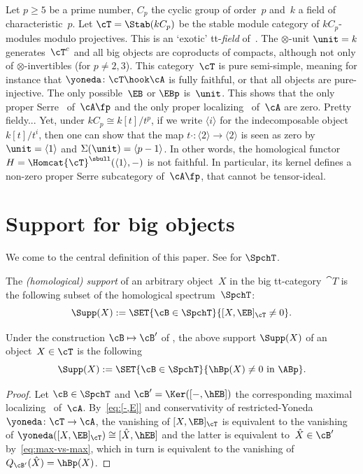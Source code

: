 \begin{Exa}
Let $p\ge 5$ be a prime number, $C_p$ the cyclic group of order~$p$ and~$k$ a field of characteristic~$p$. Let $\cT=\Stab(kC_p)$ be the stable module category of $kC_p$-modules modulo projectives. This is an `exotic' tt-\emph{field} of~\cite{BalmerKrauseStevenson19}. The $\otimes$-unit $\unit=k$ generates~$\cT^c$ and all big objects are coproducts of compacts, although not only of $\otimes$-invertibles (for $p\neq 2,3$). This category~$\cT$ is pure semi-simple, meaning for instance that $\yoneda\colon \cT\hook\cA$ is fully faithful, or that all objects are pure-injective. The only possible~$\EB$ or $\EBp$ is~$\unit$. This shows that the only proper Serre \tensid\ of~$\cA\fp$ and the only proper localizing \tensid\ of~$\cA$ are zero. Pretty fieldy... Yet, under $kC_p\cong k[t]/t^p$, if we write $\langle i\rangle$ for the indecomposable object $k[t]/t^i$, then one can show that the map $t\cdot\colon\langle2\rangle\to \langle2\rangle$ is seen as zero by $\unit=\langle1\rangle$ and $\Sigma(\unit)=\langle p-1\rangle$. In other words, the homological functor $H=\Homcat{\cT}^\sbull(\langle1\rangle,-)$ is not faithful. In particular, its kernel defines a non-zero proper Serre subcategory of~$\cA\fp$, that cannot be tensor-ideal.
\end{Exa}

\section{Support for big objects}
\label{sec:support}

We come to the central definition of this paper. See  for $\SpchT$.

\begin{Def}
\label{Def:Supp}
The \emph{(homological) support} of an arbitrary object~$X$ in the big tt-category~$\cat{T}$ is the following subset of the homological spectrum~$\SpchT$:
\[
\Supp(X):=\SET{\cB\in\SpchT}{[X,\EB]_{\cT}\neq 0}.
\]
\end{Def}

\begin{Prop}
\label{Prop:Supp}
Under the construction $\cB\mapsto \cB'$ of , the above support $\Supp(X)$ of an object~$X\in\cT$ is the following
\[
\Supp(X):=\SET{\cB\in\SpchT}{\hBp(X)\neq 0\text{ in }\ABp}.
\]
\end{Prop}

\begin{proof}
Let $\cB\in\SpchT$ and $\cB'=\Ker([-,\hEB])$ the corresponding maximal localizing \tensid\ of~$\cA$. By~\eqref{eq:[-,E]} and conservativity of restricted-Yoneda $\yoneda\colon \cT\to \cA$, the vanishing of $[X,\EB]_\cT$ is equivalent to the vanishing of $\yoneda([X,\EB]_\cT)\cong [\hat X,\hEB]$ and the latter is equivalent to~$\hat X\in{\cB'}$ by~\eqref{eq:max-vs-max}, which in turn is equivalent to the vanishing of~$Q_{\cB'}(\hat X)=\hBp(X)$.
\end{proof}


